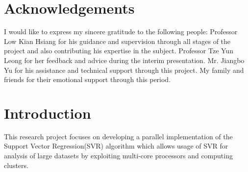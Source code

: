 \documentclass[12pt]{article}
\newcounter{reportpage}
\begin{document}
\section*{Acknowledgements}
%
I would like to express my sincere gratitude to the following people:
\newline
\newline
Professor Low Kian Hsiang for his guidance and supervision through all stages of the project and also contributing his expertise in the subject.
\newline
\newline
Professor Tze Yun Leong for her feedback and advice during the interim presentation.
\newline
\newline
Mr. Jiangbo Yu for his assistance and technical support through this project.
\newline
\newline
My family and friends for their emotional support through this period.
\cleardoublepage
\setcounter{reportpage}{\value{page}}
\tableofcontents
\cleardoublepage
{}
\section{Introduction}
This research project focuses on developing a parallel implementation of the Support Vector Regression(SVR) algorithm which allows usage of SVR for analysis of large datasets by exploiting multi-core processors and computing clusters. 
\end{document}
